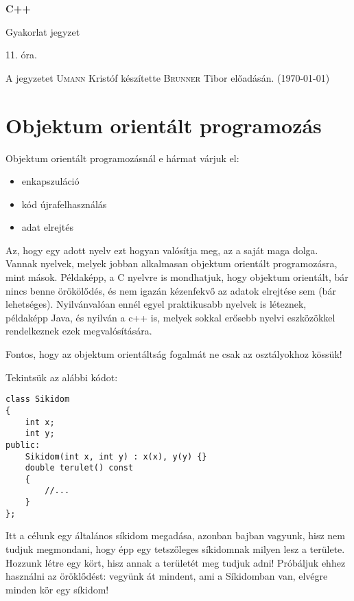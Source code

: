 \documentclass[a4paper,11.5pt]{article}
\begin{document}
	\setlength\parindent{0pt}
	\def\s{\hspace{0.2mm}\vphantom{\beta}}
	\def\Z{\mathbb{Z}}
	\def\Q{\mathbb{Q}}
	\def\R{\mathbb{R}}
	\def\C{\mathbb{C}}
	\def\N{\mathbb{N}}
	\def\Ra{\overline{\mathbb{R}}}
	
	\def\sume{\displaystyle\sum_{n=1}^{+\infty}}
	\def\sumn{\displaystyle\sum_{n=0}^{+\infty}}
	
	\def\narrow{\underset{n\rightarrow+\infty}{\longrightarrow}}
	\def\limn{\displaystyle\lim_{n\to +\infty}}
	\def\limx{\displaystyle\lim_{x\to +\infty}}
	
	\theoremstyle{definition}
	\newtheorem{theorem}{Tétel}[subsection] 
	
	\theoremstyle{definition}
	\newtheorem{definition}[theorem]{Definíció} 
	\newtheorem{example}[theorem]{Példa} 
	\newtheorem{task}[theorem]{Feladat} 
	\newtheorem{note}[theorem]{Megjegyzés}
	\begin{center}
		{\LARGE\textbf{C++}}
		
		{\Large Gyakorlat jegyzet}
		
		11. óra.
	\end{center}
	A jegyzetet \textsc{Umann} Kristóf készítette \textsc{Brunner} Tibor  előadásán. (\today)
	\section{Objektum orientált programozás}
	Objektum orientált programozásnál e hármat várjuk el:
	\begin{itemize}
		\item enkapszuláció
		\item kód újrafelhasználás
		\item adat elrejtés
	\end{itemize}
	Az, hogy egy adott nyelv ezt hogyan valósítja meg, az a saját maga dolga. Vannak nyelvek, melyek jobban alkalmasan objektum orientált programozásra, mint mások. Példaképp, a C nyelvre is mondhatjuk, hogy objektum orientált, bár nincs benne örökölődés, és nem igazán kézenfekvő az adatok elrejtése sem (bár lehetséges). Nyilvánvalóan ennél egyel praktikusabb nyelvek is léteznek, példaképp Java, és nyilván a c++ is, melyek sokkal erősebb nyelvi eszközökkel rendelkeznek ezek megvalósítására.
	
	Fontos, hogy az objektum orientáltság fogalmát ne csak az osztályokhoz kössük!
	
	\medskip
	Tekintsük az alábbi kódot:
	\begin{lstlisting}
class Sikidom
{
	int x;
	int y;
public:
	Sikidom(int x, int y) : x(x), y(y) {}
	double terulet() const
	{
		//...
	}
};
	\end{lstlisting}
	Itt a célunk egy általános síkidom megadása, azonban bajban vagyunk, hisz nem tudjuk megmondani, hogy épp egy tetszőleges síkidomnak milyen lesz a területe. Hozzunk létre egy kört, hisz annak a területét meg tudjuk adni! Próbáljuk ehhez használni az öröklődést: vegyünk át mindent, ami a Síkidomban van, elvégre minden kör egy síkidom!
	
\end{document}
